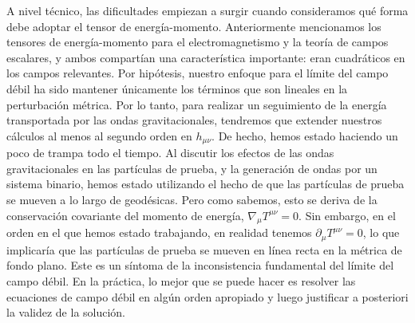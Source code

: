 \documentclass[11pt,b5paper,openany,twoside]{book}
\newcommand{\mn}{{\mu\nu}}
\newcommand{\p}[1]{{\partial_{#1}}}
\begin{document}
A nivel técnico, las dificultades empiezan a surgir cuando consideramos qué forma debe adoptar el tensor de energía-momento.
Anteriormente mencionamos los tensores de energía-momento para el electromagnetismo y la teoría de campos escalares, y ambos compartían una característica importante: eran cuadráticos en los campos relevantes.
Por hipótesis, nuestro enfoque para el límite del campo débil ha sido mantener únicamente los términos que son lineales en la perturbación métrica.
Por lo tanto, para realizar un seguimiento de la energía transportada por las ondas gravitacionales, tendremos que extender nuestros cálculos al menos al segundo orden en $h_\mn$.
De hecho, hemos estado haciendo un poco de trampa todo el tiempo.
Al discutir los efectos de las ondas gravitacionales en las partículas de prueba, y la generación de ondas por un sistema binario, hemos estado utilizando el hecho de que las partículas de prueba se mueven a lo largo de geodésicas.
Pero como sabemos, esto se deriva de la conservación covariante del momento de energía, $\nabla_\mu T^\mn=0$.
Sin embargo, en el orden en el que hemos estado trabajando, en realidad tenemos $\p\mu T^\mn=0$, lo que implicaría que las partículas de prueba se mueven en línea recta en la métrica de fondo plano.
Este es un síntoma de la inconsistencia fundamental del límite del campo débil.
En la práctica, lo mejor que se puede hacer es resolver las ecuaciones de campo débil en algún orden apropiado y luego justificar a posteriori la validez de la solución.
\end{document}
